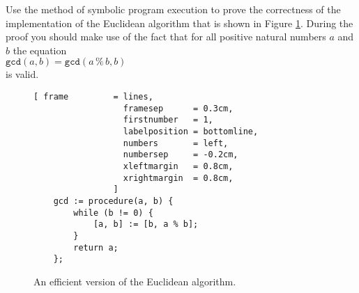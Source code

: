 \exercise
Use the method of symbolic program execution to prove the correctness of the implementation of the
Euclidean algorithm that is shown in Figure \ref{fig:gcd.stlx}.  During the proof you should make
use of the fact that for all positive natural numbers $a$ and $b$ the equation
\\[0.2cm]
\hspace*{1.3cm}
$\mathtt{gcd}(a, b) = \mathtt{gcd}(a \,\texttt{\%}\, b, b)$
\\[0.2cm]
is valid.  

\begin{figure}[!ht]
\centering
\begin{Verbatim}[ frame         = lines, 
                  framesep      = 0.3cm, 
                  firstnumber   = 1,
                  labelposition = bottomline,
                  numbers       = left,
                  numbersep     = -0.2cm,
                  xleftmargin   = 0.8cm,
                  xrightmargin  = 0.8cm,
                ]
    gcd := procedure(a, b) {
        while (b != 0) {
            [a, b] := [b, a % b];
        }
        return a;
    };
\end{Verbatim}
\vspace*{-0.3cm}
\caption{An efficient version of the Euclidean algorithm.}
\label{fig:gcd.stlx}
\end{figure}


